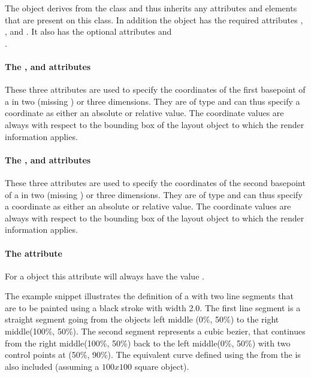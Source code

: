 The \RenderCubicBezier object derives from the \RenderPoint class and
thus inherits any attributes and elements that are present on this
class.
In addition the \RenderCubicBezier object has the required attributes , ,  and . It also has the optional attributes  and \\ .

\paragraph{The \fixttspace{}, \fixttspace{} and \fixttspace{} attributes}

These three attributes are used to specify the coordinates of the first basepoint of a \RenderCubicBezier in two (missing ) or three dimensions. They are of type \RelAbsVector and can thus specify a coordinate as either an absolute or relative value. The coordinate
values are always with respect to the bounding box of the layout object to which the
render information applies.


\paragraph{The \fixttspace{}, \fixttspace{} and \fixttspace{} attributes}

These three attributes are used to specify the coordinates of the second basepoint of a \RenderCubicBezier in two (missing ) or three dimensions. They are of type \RelAbsVector and can thus specify a coordinate as either an absolute or relative value. The coordinate
values are always with respect to the bounding box of the layout object to which the
render information applies.

\paragraph{The \fixttspace{} attribute}

For a \RenderCubicBezier object this attribute will always have the value .



The example snippet illustrates the definition of a \RenderCurve with two line segments 
that are to be painted using a black stroke with width 2.0.
The first line segment is a straight segment going from the objects left middle (0\%, 50\%) 
to the right middle(100\%, 50\%). The second segment represents a cubic bezier, that 
continues from the right middle(100\%, 50\%) back to the left middle(0\%, 50\%) with 
two control points at (50\%, 90\%).  The equivalent curve defined using the  from the \LayoutPackage is also included (assuming a $100 x 100$ square object).


